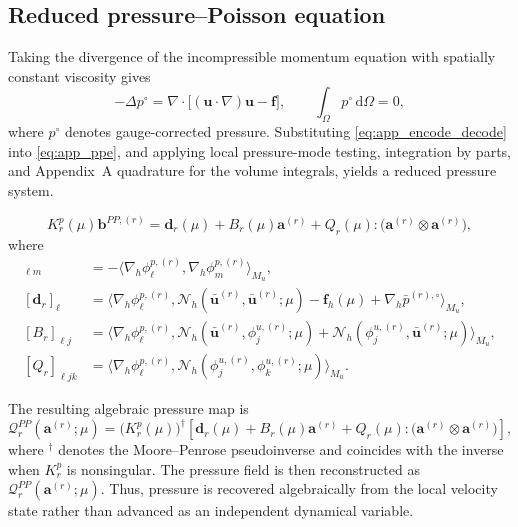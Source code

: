 \subsection{Reduced pressure--Poisson equation}
\label{app:reduced_ppe}

Taking the divergence of the incompressible momentum equation with spatially constant viscosity gives
\begin{equation}
    -\Delta p^\circ
    =
    \nabla\cdot\bigl[(\bm u\cdot\nabla)\bm u-\bm f\bigr],
    \qquad
    \int_\Omega p^\circ\,\mathrm d\Omega=0,
    \label{eq:app_ppe}
\end{equation}
where $p^\circ$ denotes gauge-corrected pressure. Substituting \eqref{eq:app_encode_decode} into \eqref{eq:app_ppe}, and applying local pressure-mode testing, integration by parts, and Appendix~A quadrature for the volume integrals, yields a reduced pressure system.

\begin{equation}
    K_r^p(\mu)\bm b^{PP,(r)}
    =
    \bm d_r(\mu)
    +B_r(\mu)\bm a^{(r)}
    +Q_r(\mu):
    \bigl(\bm a^{(r)}\otimes\bm a^{(r)}\bigr),
    \label{eq:app_pressure_poisson_system}
\end{equation}
where
\begin{align}
    [K_r^p]_{\ell m}
    &=
    -\bigl\langle
        \nabla_h\phi_\ell^{p,(r)},
        \nabla_h\phi_m^{p,(r)}
    \bigr\rangle_{M_u},
    \label{eq:app_ppe_K_definition}
    \\
    [\bm d_r]_\ell
    &=
    \bigl\langle
        \nabla_h\phi_\ell^{p,(r)},
        \mathcal N_h(\bar{\bm u}^{(r)},\bar{\bm u}^{(r)};\mu)
        -\bm f_h(\mu)
        +\nabla_h\bar p^{(r),\circ}
    \bigr\rangle_{M_u},
    \label{eq:app_ppe_d_definition}
    \\
    [B_r]_{\ell j}
    &=
    \bigl\langle
        \nabla_h\phi_\ell^{p,(r)},
        \mathcal N_h(\bar{\bm u}^{(r)},\phi_j^{u,(r)};\mu)
        +\mathcal N_h(\phi_j^{u,(r)},\bar{\bm u}^{(r)};\mu)
    \bigr\rangle_{M_u},
    \label{eq:app_ppe_B_definition}
    \\
    [Q_r]_{\ell jk}
    &=
    \bigl\langle
        \nabla_h\phi_\ell^{p,(r)},
        \mathcal N_h(\phi_j^{u,(r)},\phi_k^{u,(r)};\mu)
    \bigr\rangle_{M_u}.
    \label{eq:app_ppe_Q_definition}
\end{align}


The resulting algebraic pressure map is
\begin{equation}
    \mathcal Q_r^{PP}(\bm a^{(r)};\mu)
    =
    \bigl(K_r^p(\mu)\bigr)^\dagger
    \left[
        \bm d_r(\mu)
        +B_r(\mu)\bm a^{(r)}
        +Q_r(\mu):
        \bigl(\bm a^{(r)}\otimes\bm a^{(r)}\bigr)
    \right],
    \label{eq:app_pressure_poisson_map}
\end{equation}
where ${}^\dagger$ denotes the Moore--Penrose pseudoinverse and  coincides with the inverse when $K_r^p$ is nonsingular.
The pressure field is then reconstructed as
$\mathcal Q_r^{PP}(\bm a^{(r)};\mu)$.
Thus, pressure is recovered algebraically from the local velocity state rather than advanced as an independent dynamical variable.

